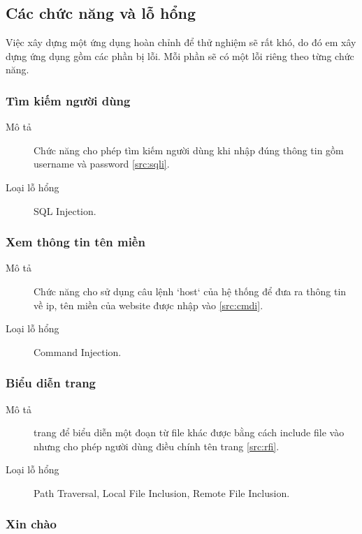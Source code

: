 \documentclass[./../main.tex]{subfiles}
\begin{document}
\subsection{Các chức năng và lỗ hổng}

Việc xây dựng một ứng dụng hoàn chỉnh để thử nghiệm sẽ rất khó,
do đó em xây dựng ứng dụng gồm các phần bị lỗi. Mỗi phần sẽ có một lỗi riêng
theo từng chức năng.

\subsubsection{Tìm kiếm người dùng}

\begin{description}
	\item[Mô tả] Chức năng cho phép tìm kiếm người dùng khi nhập đúng
	      thông tin gồm username và password \ref{src:sqli}.
	\item [Loại lỗ hổng] SQL Injection.
\end{description}

\subsubsection{Xem thông tin tên miền}

\begin{description}
	\item[Mô tả] Chức năng cho sử dụng câu lệnh `host` của hệ thống để đưa ra thông tin về ip, tên miền của website được nhập vào \ref{src:cmdi}.
	\item[Loại lỗ hổng] Command Injection.
\end{description}

\subsubsection{Biểu diễn trang}

\begin{description}
	\item[Mô tả] trang để biểu diễn một đoạn từ file khác được bằng cách
	      include file vào nhưng cho phép người dùng điều chính tên trang \ref{src:rfi}.
	\item[Loại lỗ hổng] Path Traversal, Local File Inclusion, Remote
	      File Inclusion.
\end{description}

\subsubsection{Xin chào}
\end{document}

